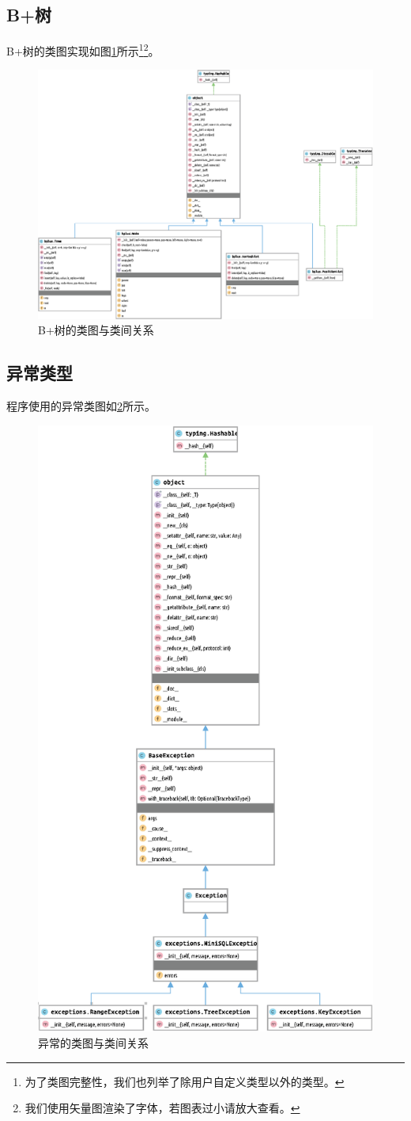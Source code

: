 \documentclass[UTF8]{ctexrep} %
\begin{document}
\subsection{B+树}
B+树的类图实现如图\ref{fig:bplus_diagram}所示\footnote{为了类图完整性，我们也列举了除用户自定义类型以外的类型。}\footnote{我们使用矢量图渲染了字体，若图表过小请放大查看。}。
\begin{figure}[H]
    \centering
    \includegraphics[width=0.85\linewidth]{figure/bplus.eps}
    \caption{B+树的类图与类间关系}
    \label{fig:bplus_diagram}
\end{figure}
\subsection{异常类型}
程序使用的异常类图如\ref{fig:exceptions_diagram}所示。
\begin{figure}[H]
    \centering
    \includegraphics[width=0.5\linewidth]{figure/exceptions.eps}
    \caption{异常的类图与类间关系}
    \label{fig:exceptions_diagram}
\end{figure}
\end{document}
